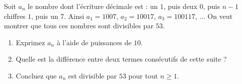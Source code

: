 Soit $a_n$ le nombre dont l'écriture décimale est : un $1$, puis deux $0$, puis
$n-1$ chiffres $1$, puis un $7$. Ainsi $a_1 = 1007$, $a_2 = 10017$,
$a_3 = 100117$, $\ldots$ On veut montrer que tous ces nombres sont divisibles
par $53$.
\begin{enumerate}
  \item Exprimez $a_n$ à l'aide de puissances de $10$.
  \item Quelle est la différence entre deux termes consécutifs de cette suite ?
  \item Concluez que $a_n$ est divisible par $53$ pour tout $n \geq 1$.
\end{enumerate}
